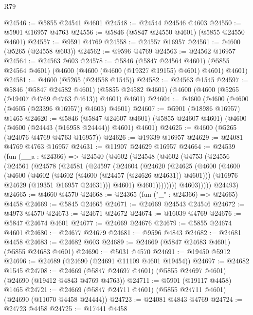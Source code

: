 \begin{lexlean}{R79}
\begin{coremodule}
@24546 := @5855 @24541 @4601
@24548 := @24544 @24546 @4603
@24550 := @5901 @16957 @4763
@24556 := @5846 (@5847 @24550 @4601) (@5855 @24550 @4601)
@24557 := @9591 @4769
@24558 := @24557 @16957
@24561 := @4600 (@5265 (@24558 @603))
@24562 := @9596 @4769
@24563 := @24562 @16957
@24564 := @24563 @603
@24578 := @5846
    (@5847 @24564 @4601)
    (@5855 @24564 @4601)
    (@4600 (@4600 (@4600 (@19327 @19155) @4601) @4601) @4601)
@24581 := @4600 (@5265 (@24558 @1545))
@24582 := @24563 @1545
@24597 := @5846
    (@5847 @24582 @4601)
    (@5855 @24582 @4601)
    (@4600 (@4600 (@5265 (@19407 @4769 @4763 @4613)) @4601) @4601)
@24604 := @4600 (@4600 (@4600 (@4605 (@23396 @16957)) @4603) @4601)
@24607 := @5901 (@18986 @16957) @1465
@24620 := @5846
    (@5847 @24607 @4601)
    (@5855 @24607 @4601)
    (@4600 (@4600 (@24443 (@16958 @24444)) @4601) @4601)
@24625 := @4600 (@5265 (@24076 @4769 @4763 @16957))
@24626 := @19339 @16957
@24629 := @24081 @4769 @4763 @16957
@24631 := @11907 @24629 @16957
@24664 := @24539
    (fun (__a : @24366) =>
    @24540
      (@4602
        (@24548
          (@4602
            (@4753
              (@24556
                (@24561
                  (@24578
                    (@24581
                      (@24597
                        (@24604
                          (@24620
                            (@24625
                              (@4600
                                (@4600
                                  (@4600
                                    (@4602 (@4602 (@4600 (@24457 (@24626 @24631)) @4601)))
                                    (@16976 @24629 (@19351 @16957 @24631)))
                                  @4601)
                                @4601))))))))
                @4603)))))
      @24493)
@24665 := @4660 @4570
@24668 := @24365 (fun ("_" : @24366) => @24665) @4458
@24669 := @5845 @24665
@24671 := @24669 @24543 @24546
@24672 := @4973 @4570
@24673 := @24671 @24672
@24674 := @16039 @4769
@24676 := @5847 @24674 @4601
@24677 := @24669 @24676
@24679 := @5855 @24674 @4601
@24680 := @24677 @24679
@24681 := @9596 @4843
@24682 := @24681 @4458
@24683 := @24682 @603
@24689 := @24669 (@5847 @24683 @4601) (@5855 @24683 @4601)
@24690 := @5031 @4570
@24691 := @19450 @5912
@24696 := @24689 (@24690 (@24691 @11109 @4601 @19454))
@24697 := @24682 @1545
@24708 := @24669 (@5847 @24697 @4601) (@5855 @24697 @4601) (@24690 (@19412 @4843 @4769 @4763))
@24711 := @5901 (@19117 @4458) @1465
@24721 := @24669 (@5847 @24711 @4601) (@5855 @24711 @4601) (@24690 (@11070 @4458 @24444))
@24723 := @24081 @4843 @4769
@24724 := @24723 @4458
@24725 := @17441 @4458

\end{coremodule}
\end{lexlean}
